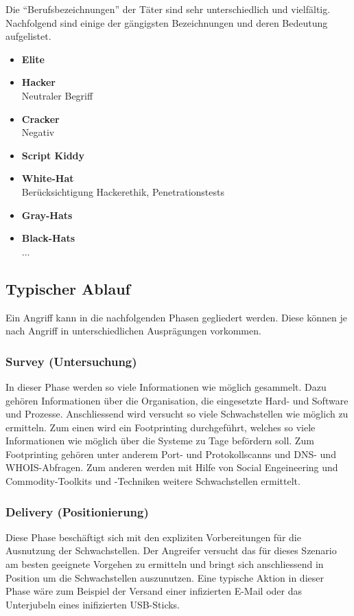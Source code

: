 Die "`Berufsbezeichnungen"' der Täter sind sehr unterschiedlich und vielfältig. Nachfolgend sind einige der gängigsten Bezeichnungen und deren Bedeutung aufgelistet.

\begin{itemize}
\item \textbf{Elite} \\
\item \textbf{Hacker} \\
Neutraler Begriff
\item \textbf{Cracker} \\
Negativ
\item \textbf{Script Kiddy} \\
\item \textbf{White-Hat} \\
Berücksichtigung Hackerethik, Penetrationstests
\item \textbf{Gray-Hats} \\
\item \textbf{Black-Hats} \\
...
\end{itemize}


\subsection{Typischer Ablauf}
Ein Angriff kann in die nachfolgenden Phasen gegliedert werden. Diese können je nach Angriff in unterschiedlichen Ausprägungen vorkommen.

\subsubsection{Survey (Untersuchung)}
In dieser Phase werden so viele Informationen wie möglich gesammelt. Dazu gehören Informationen über die Organisation, die eingesetzte Hard- und Software und Prozesse. Anschliessend wird versucht so viele Schwachstellen wie möglich zu ermitteln. Zum einen wird ein Footprinting durchgeführt, welches so viele Informationen wie möglich über die Systeme zu Tage befördern soll. Zum Footprinting gehören unter anderem Port- und Protokollscanns und DNS- und WHOIS-Abfragen. Zum anderen werden mit Hilfe von Social Engeineering und Commodity-Toolkits und -Techniken weitere Schwachstellen ermittelt.


\subsubsection{Delivery (Positionierung)}
Diese Phase beschäftigt sich mit den expliziten Vorbereitungen für die Ausnutzung der Schwachstellen. Der Angreifer versucht das für dieses Szenario am besten geeignete Vorgehen zu ermitteln und bringt sich anschliessend in Position um die Schwachstellen auszunutzen. Eine typische Aktion in dieser Phase wäre zum Beispiel der Versand einer infizierten E-Mail oder das Unterjubeln eines inifizierten USB-Sticks.


